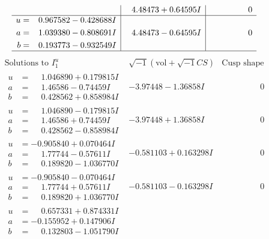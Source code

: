 \documentclass[1p]{elsarticle_modified}
\theoremstyle{definition}
\newcommand{\I}{\sqrt{-1}}
\begin{document}
$$\begin{array}{c|c|c}
 & \phantom{-}4.48473 + 0.64595 I & \phantom{-0.000000 } 0 \\ \hline\begin{aligned}
u &= \phantom{-}0.967582 - 0.428688 I \\
a &= \phantom{-}1.039380 - 0.808691 I \\
b &= \phantom{-}0.193773 - 0.932549 I\end{aligned}
 & \phantom{-}4.48473 - 0.64595 I & \phantom{-0.000000 } 0\\
 \hline 
 \end{array}$$\newpage$$\begin{array}{c|c|c}  
\text{Solutions to }I^u_{1}& \I (\text{vol} + \sqrt{-1}CS) & \text{Cusp shape}\\
 \hline 
\begin{aligned}
u &= \phantom{-}1.046890 + 0.179815 I \\
a &= \phantom{-}1.46586 - 0.74459 I \\
b &= \phantom{-}0.428562 + 0.858984 I\end{aligned}
 & -3.97448 - 1.36858 I & \phantom{-0.000000 } 0 \\ \hline\begin{aligned}
u &= \phantom{-}1.046890 - 0.179815 I \\
a &= \phantom{-}1.46586 + 0.74459 I \\
b &= \phantom{-}0.428562 - 0.858984 I\end{aligned}
 & -3.97448 + 1.36858 I & \phantom{-0.000000 } 0 \\ \hline\begin{aligned}
u &= -0.905840 + 0.070464 I \\
a &= \phantom{-}1.77744 - 0.57611 I \\
b &= \phantom{-}0.189820 - 1.036770 I\end{aligned}
 & -0.581103 + 0.163298 I & \phantom{-0.000000 } 0 \\ \hline\begin{aligned}
u &= -0.905840 - 0.070464 I \\
a &= \phantom{-}1.77744 + 0.57611 I \\
b &= \phantom{-}0.189820 + 1.036770 I\end{aligned}
 & -0.581103 - 0.163298 I & \phantom{-0.000000 } 0 \\ \hline\begin{aligned}
u &= \phantom{-}0.657331 + 0.874331 I \\
a &= -0.155952 + 0.147906 I \\
b &= \phantom{-}0.132803 - 1.051790 I\end{aligned}

\end{array}$$
\end{document}
